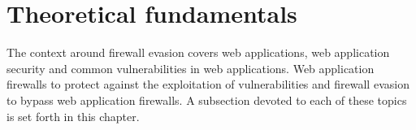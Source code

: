 \section{Theoretical fundamentals}
\label{sec:fundamentals}
The context around firewall evasion covers web applications, web application security and common vulnerabilities in web applications. Web application firewalls to protect against the exploitation of vulnerabilities and firewall evasion to bypass web application firewalls.
A subsection devoted to each of these topics is set forth in this chapter.
